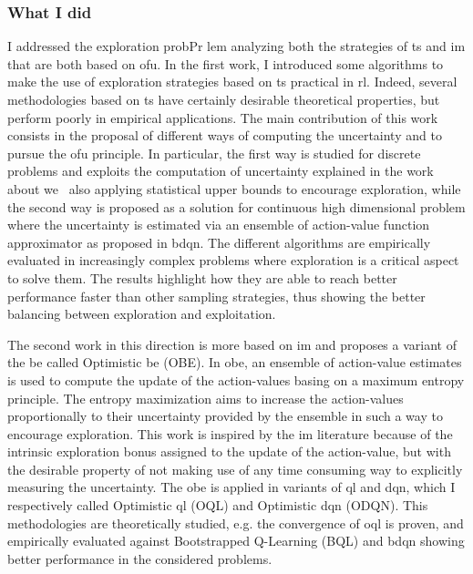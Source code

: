 \subsubsection{What I did}
I addressed the exploration probPr	lem analyzing both the strategies of \gls{ts} and \gls{im} that are both based on \gls{ofu}. In the first work, I introduced some algorithms to make the use of exploration strategies based on \gls{ts} practical in \gls{rl}. Indeed, several methodologies based on \gls{ts} have certainly desirable theoretical properties, but perform poorly in empirical applications. The main contribution of this work consists in the proposal of different ways of computing the uncertainty and to pursue the \gls{ofu} principle. In particular, the first way is studied for discrete problems and exploits the computation of uncertainty explained in the work about \gls{we}~\cite{deramo2016estimating} also applying statistical upper bounds to encourage exploration, while the second way is proposed as a solution for continuous high dimensional problem where the uncertainty is estimated via an ensemble of action-value function approximator as proposed in \gls{bdqn}. The different algorithms are empirically evaluated in increasingly complex problems where exploration is a critical aspect to solve them. The results highlight how they are able to reach better performance faster than other sampling strategies, thus showing the better balancing between exploration and exploitation.

The second work in this direction is more based on \gls{im} and proposes a variant of the \gls{be} called Optimistic \gls{be} (OBE). In \gls{obe}, an ensemble of action-value estimates is used to compute the update of the action-values basing on a maximum entropy principle. The entropy maximization aims to increase the action-values proportionally to their uncertainty provided by the ensemble in such a way to encourage exploration. This work is inspired by the \gls{im} literature because of the intrinsic exploration bonus assigned to the update of the action-value, but with the desirable property of not making use of any time consuming way to explicitly measuring the uncertainty. The \gls{obe} is applied in variants of \gls{ql} and \gls{dqn}, which I respectively called Optimistic \gls{ql} (OQL) and Optimistic \gls{dqn} (ODQN). This methodologies are theoretically studied, e.g. the convergence of \gls{oql} is proven, and empirically evaluated against Bootstrapped Q-Learning (BQL) and \gls{bdqn} showing better performance in the considered problems.

